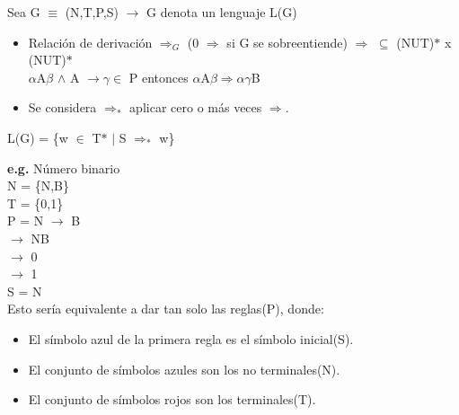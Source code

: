 \documentclass[\main/ApuntesPL.tex]{subfiles}
\begin{document}
      \bigskip
      \par
      Sea G $\equiv$ (N,T,P,S) $\rightarrow$ G denota un lenguaje L(G)
      \begin{itemize}
        \item Relación de derivación $\Rightarrow_G$ (0 $\Rightarrow$ si G se sobreentiende) $\Rightarrow$ $\subseteq$ (NUT)$\ast$ x (NUT)$\ast$\\
              \hspace{5mm}$\alpha$A$\beta$ $\wedge$ A $\rightarrow \gamma \in$ P entonces $\alpha$A$\beta \Rightarrow \alpha \gamma$B
        \item Se considera $\Rightarrow_\ast$ aplicar cero o más veces $\Rightarrow$.
      \end{itemize}

      \par
      L(G) = \{w $\in$ T$\ast$ $\mid$ S $\Rightarrow_\ast$ w\}

      \bigskip
      \par
      \textbf{e.g.} Número binario\\
      \hspace{5mm}N = \{N,B\}\\
      \hspace{5mm}T = \{0,1\}\\
      \hspace{5mm}P = {\color{blue}N} $\rightarrow$ B\\
       $\rightarrow$ NB\\
       $\rightarrow$ {\color{red}0}\\
       $\rightarrow$ {\color{red}1}\\
      \hspace{5mm}S = N\\
      \vspace{2mm}
      \hspace{5mm}Esto sería equivalente a dar tan solo las reglas(P), donde:
      \begin{itemize}
        \item El símbolo {\color{blue}azul} de la primera regla es el símbolo inicial(S).
        \item El conjunto de símbolos {\color{blue}azules} son los no terminales(N).
        \item El conjunto de símbolos {\color{red}rojos} son los terminales(T).
      \end{itemize}
\end{document}
